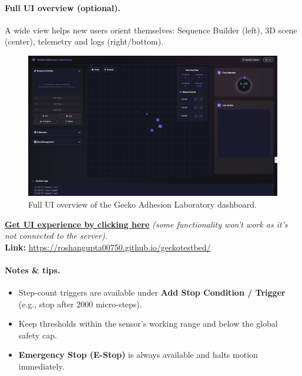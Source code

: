 \documentclass[
    twocolumn,
    fontsize = 10pt,
    parskip = half+,
    headings = small,
    headwidth = text,
    footwidth = text,
]{scrartcl}
\begin{document}
\paragraph{\textbf{Full UI overview (optional).}}
A wide view helps new users orient themselves: Sequence Builder (left), 3D scene (center), telemetry and logs (right/bottom).
\begin{figure}[htbp]\centering
  \includegraphics[width=\linewidth]{pics/ui-overview.png}
  \caption{Full UI overview of the Gecko Adhesion Laboratory dashboard.}
  \label{fig:ui-overview}
\end{figure}


\noindent\href{https://roshangupta00750.github.io/geckotestbed/}
{\textbf{Get UI experience by clicking here}}
\textit{(some functionality won’t work as it’s not connected to the server).}\\
\textbf{Link:} \url{https://roshangupta00750.github.io/geckotestbed/}



\paragraph{\textbf{Notes \& tips.}}
\begin{itemize}
  \item Step-count triggers are available under \textbf{Add Stop Condition / Trigger} (e.g., stop after 2000 micro-steps).
  \item Keep thresholds within the sensor’s working range and below the global safety cap.
  \item \textbf{Emergency Stop (E-Stop)} is always available and halts motion immediately.
\end{itemize}


\end{document}
